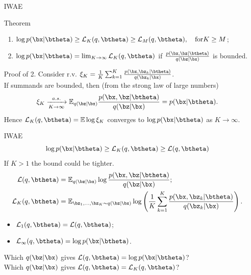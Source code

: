 \begin{frame}{IWAE}
	\begin{block}{Theorem}
		\begin{enumerate}
			\item $\log p(\bx | \btheta) \geq \mathcal{L}_K (q, \btheta) \geq \mathcal{L}_M (q, \btheta), \quad \text{for} K \geq M$;
			\item $\log p(\bx | \btheta) = \lim_{K \rightarrow \infty} \mathcal{L}_K (q, \btheta)$ if $\frac{p(\bx, \bz | \btheta)}{q(\bz | \bx)}$ is bounded.
		\end{enumerate}
		\vspace{-0.2cm}
	\end{block}
	\begin{block}{Proof of 2.}
		\vspace{0.2cm}
		Consider r.v. $\xi_K = \frac{1}{K}\sum_{k=1}^K \frac{p(\bx, \bz_k | \btheta)}{q(\bz_k | \bx)}$. \\
		\vspace{0.2cm}
		If summands are bounded, then (from the strong law of large numbers)
		\[
		\xi_K \xrightarrow[K \rightarrow \infty]{a.s.} \mathbb{E}_{q(\bz | \bx)} \frac{p(\bx, \bz | \btheta)}{q(\bz | \bx)} = p(\bx | \btheta).
		\]
		Hence $\mathcal{L}_K (q, \btheta) = \mathbb{E} \log \xi_K$ converges to $\log p(\bx | \btheta)$ as $K \rightarrow \infty$.
	\end{block}

\end{frame}
\begin{frame}{IWAE}
	\[
	\log p(\bx | \btheta) \geq \mathcal{L}_K(q, \btheta) \geq \mathcal{L}(q, \btheta)
	\]
	If $K > 1$ the bound could be tighter.
	\begin{align*}
		\mathcal{L} (q, \btheta) &= \mathbb{E}_{q(\bz | \bx)} \log \frac{p(\bx, \bz | \btheta)}{q(\bz| \bx)}; \\
		\mathcal{L}_K (q, \btheta) &= \mathbb{E}_{\bz_1, \dots, \bz_K \sim q(\bz | \bx)} \log \left( \frac{1}{K}\sum_{k=1}^K\frac{p(\bx, \bz_k | \btheta)}{q(\bz_k| \bx)} \right).
	\end{align*}
	\vspace{-0.2cm}
	\begin{itemize}
		\item $\mathcal{L}_1(q, \btheta) = \mathcal{L}(q, \btheta)$;
		\item $\mathcal{L}_{\infty}(q, \btheta) = \log p(\bx | \btheta)$.
	\end{itemize}
	\vspace{0.2cm}
	Which $q(\bz | \bx)$ gives $\mathcal{L}(q, \btheta) = \log p(\bx | \btheta)$? \\
	\vspace{0.2cm}
	Which $q(\bz | \bx)$ gives $\mathcal{L}(q, \btheta) = \mathcal{L}_K(q, \btheta)$?

\end{frame}
